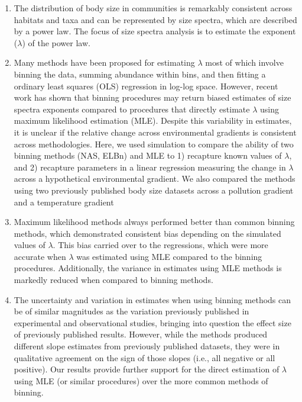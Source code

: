 \documentclass[
]{article}
\providecommand{\tightlist}{%
  \setlength{\itemsep}{0pt}\setlength{\parskip}{0pt}}
\begin{document}
\begin{enumerate}
\def\labelenumi{\arabic{enumi}.}
\tightlist
\item
  The distribution of body size in communities is remarkably consistent
  across habitats and taxa and can be represented by size spectra, which
  are described by a power law. The focus of size spectra analysis is to
  estimate the exponent (\(\lambda\)) of the power law.
\item
  Many methods have been proposed for estimating \(\lambda\) most of
  which involve binning the data, summing abundance within bins, and
  then fitting a ordinary least squares (OLS) regression in log-log
  space. However, recent work has shown that binning procedures may
  return biased estimates of size spectra exponents compared to
  procedures that directly estimate \(\lambda\) using maximum likelihood
  estimation (MLE). Despite this variability in estimates, it is unclear
  if the relative change across environmental gradients is consistent
  across methodologies. Here, we used simulation to compare the ability
  of two binning methods (NAS, ELBn) and MLE to 1) recapture known
  values of \(\lambda\), and 2) recapture parameters in a linear
  regression measuring the change in \(\lambda\) across a hypothetical
  environmental gradient. We also compared the methods using two
  previously published body size datasets across a pollution gradient
  and a temperature gradient
\item
  Maximum likelihood methods always performed better than common binning
  methods, which demonstrated consistent bias depending on the simulated
  values of \(\lambda\). This bias carried over to the regressions,
  which were more accurate when \(\lambda\) was estimated using MLE
  compared to the binning procedures. Additionally, the variance in
  estimates using MLE methods is markedly reduced when compared to
  binning methods.
\item
  The uncertainty and variation in estimates when using binning methods
  can be of similar magnitudes as the variation previously published in
  experimental and observational studies, bringing into question the
  effect size of previously published results. However, while the
  methods produced different slope estimates from previously published
  datasets, they were in qualitative agreement on the sign of those
  slopes (i.e., all negative or all positive). Our results provide
  further support for the direct estimation of \(\lambda\) using MLE (or
  similar procedures) over the more common methods of binning.
\end{enumerate}
\end{document}
